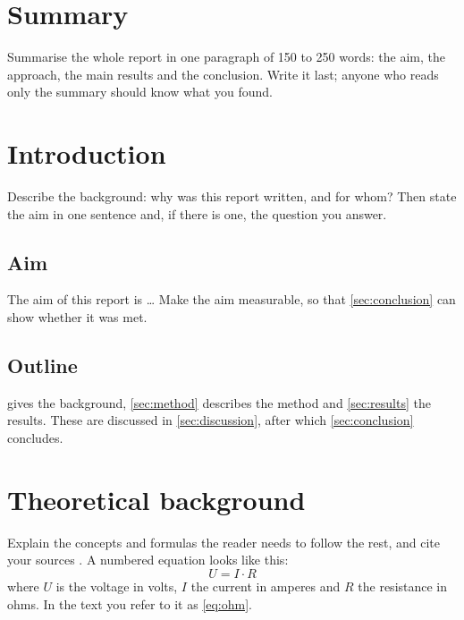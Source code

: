 \documentclass[11pt, a4paper]{article}
\begin{document}
\maketitlepage


\section*{Summary}
Summarise the whole report in one paragraph of 150 to 250 words: the aim,
the approach, the main results and the conclusion. Write it last; anyone
who reads only the summary should know what you found.

\tableofcontents
\clearpage


\section{Introduction}
\label{sec:introduction}
Describe the background: why was this report written, and for whom? Then
state the aim in one sentence and, if there is one, the question you
answer.

\subsection{Aim}
The aim of this report is \ldots{} Make the aim measurable, so that
\cref{sec:conclusion} can show whether it was met.

\subsection{Outline}
 gives the background, \cref{sec:method} describes the
method and \cref{sec:results} the results. These are discussed in
\cref{sec:discussion}, after which \cref{sec:conclusion} concludes.

\section{Theoretical background}
\label{sec:theory}
Explain the concepts and formulas the reader needs to follow the rest, and
cite your sources \parencite{lamport1994}. A numbered equation looks like
this:
\begin{equation}
  \label{eq:ohm}
  U = I \cdot R
\end{equation}
where $U$ is the voltage in volts, $I$ the current in amperes and $R$ the
resistance in ohms. In the text you refer to it as \cref{eq:ohm}.
\end{document}
